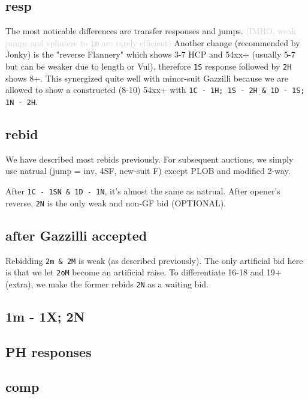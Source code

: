 \subsection{resp}

The most noticable differences are transfer responses and jumps. 
\textcolor{lightgrey}{(IMHO, weak jumps and splinters to \texttt{1m} are rarely efficient)}
Another change (recommended by Jonky) is the "reverse Flannery" which shows 3-7 HCP and 54xx+ (usually 5-7 but can be weaker due to length or Vul), therefore \texttt{1S} response followed by \texttt{2H} shows 8+.
This synergized quite well with minor-suit Gazzilli because we are allowed to show a constructed (8-10) 54xx+ with \texttt{1C - 1H; 1S - 2H \& 1D - 1S; 1N - 2H}.


\subsection{rebid}

We have described most rebids previously. For subsequent auctions, we simply use natrual (jump = inv, 4SF, new-suit F) except PLOB and modified 2-way.


After \texttt{1C - 1SN \& 1D - 1N}, it's almost the same as natrual. After opener's reverse, \texttt{2N} is the only weak and non-GF bid (OPTIONAL).


\subsection{after Gazzilli accepted}

Rebidding \texttt{2m \& 2M} is weak (as described previously). 
The only artificial bid here is that we let \texttt{2oM} become an artificial raise.
To differentiate 16-18 and 19+ (extra), we make the former rebids \texttt{2N} as a waiting bid.


\subsection{1m - 1X; 2N}


\subsection{PH responses}


\subsection{comp}


